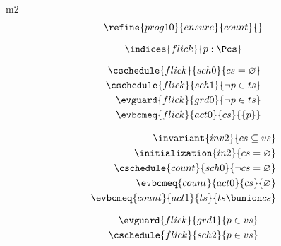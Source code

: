 \documentclass{article}
\begin{document}
\begin{machine}{m2}
\begin{align*}
	\refine{prog10}{ensure}{count}{} %
\end{align*}


\[ \indices{flick}{p : \Pcs} \]

\begin{align}
	\cschedule{flick}{sch0}{ cs = \emptyset } \\
	\cschedule{flick}{sch1}{ \neg p \in ts } \\
	\evguard{flick}{grd0}{ \neg p \in ts } \\
	\evbcmeq{flick}{act0}{cs}{ \{ p \} }
\end{align}






\begin{align}
	\invariant{inv2}{cs \subseteq vs} \\
	\initialization{in2}{ cs = \emptyset } \\
	\cschedule{count}{sch0}{ \neg cs = \emptyset } \\
	\evbcmeq{count}{act0}{cs}{\emptyset} \\
	\evbcmeq{count}{act1}{ts}{ ts \bunion cs }
\end{align}




\begin{align*}
	\evguard{flick}{grd1}{p \in vs} \\
	\cschedule{flick}{sch2}{p \in vs}
\end{align*}



\end{machine}
\end{document}
